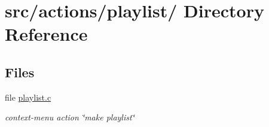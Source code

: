 \hypertarget{dir_000037}{
\section{src/actions/playlist/ Directory Reference}
\label{dir_000037}
}
\subsection*{Files}
\begin{CompactItemize}
\item 
file \hyperlink{playlist_8c}{playlist.c}
\begin{CompactList}\small\item\em context-menu action \char`\"{}make playlist\char`\"{} \item\end{CompactList}

\end{CompactItemize}
